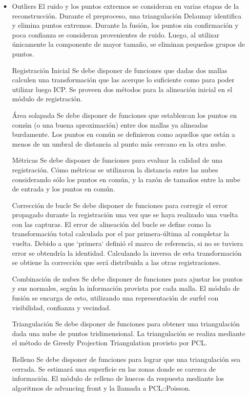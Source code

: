\documentclass{pfc}
\begin{document}
		\begin{itemize}

			\item {Outliers}
		El ruido y los puntos extremos se consideran en varias etapas de la reconstrucción.
		Durante el preproceso, una triangulación Delaunay identifica y elimina puntos extremos.
		Durante la fusión, los puntos sin confirmación y poca confianza se consideran provenientes de ruido.
		Luego, al utilizar únicamente la componente de mayor tamaño, se eliminan pequeños grupos de puntos.

	{Registración Inicial}
	{Se debe disponer de funciones que dadas dos mallas calculen una
	transformación que las acerque lo suficiente como para poder
	utilizar luego ICP.}
		Se proveen dos métodos para la alineación inicial en el módulo de registración.

	{Área solapada}
	{Se debe disponer de funciones que establezcan los puntos en común (o una buena
	aproximación) entre dos mallas ya alineadas burdamente.}
		Los puntos en común se definieron como aquellos que están a menos de un umbral de distancia
		al punto más cercano en la otra nube.

	{Métricas}
	{Se debe disponer de funciones para evaluar la calidad de una registración.}
		Cómo métricas se utilizaron la distancia entre las nubes considerando sólo los puntos en común,
		y la razón de tamaños entre la nube de entrada y los puntos en común.

	{Corrección de bucle}
	{Se debe disponer de funciones para corregir el error propagado durante la registración
	una vez que se haya realizado una vuelta con las capturas.}
		El error de alineación del bucle se define como la transformación total
		calculada por el par primera-última al completar la vuelta. Debido a que `primera`
		definió el marco de referencia, si no se tuviera error se obtendría la identidad.
		Calculando la inversa de esta transformación se obtiene la corrección que será distribuida
		a las otras registraciones.

	{Combinación de nubes}
	{Se debe disponer de funciones para ajustar los puntos y sus normales,
	según la información provista por cada malla.}
		El módulo de fusión se encarga de esto, utilizando una representación de surfel con visibilidad, confianza y vecindad.

	{Triangulación}
	{Se debe disponer de funciones para obtener una triangulación dada una nube de puntos tridimensional.}
		La triangulación se realiza mediante el método de Greedy Projection Triangulation provisto por PCL.

	{Relleno}
	{Se debe disponer de funciones para lograr que una triangulación sea cerrada. Se
	estimará una superficie en las zonas donde se carezca de
	información.}
		El módulo de relleno de huecos da respuesta mediante los algoritmos de advancing front y
		la llamada a PCL::Poisson.
		\end{itemize}
\end{document}
